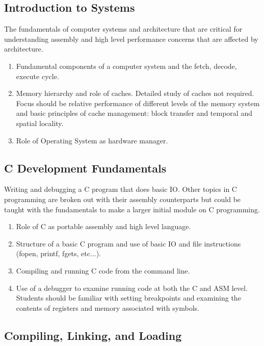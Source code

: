 \documentclass[12pt,letterpaper]{article}
\begin{document}
	\subsection{Introduction to Systems}

	The fundamentals of computer systems and architecture that are critical for understanding assembly and high level performance concerns that are affected by architecture.

	\begin{enumerate}
		\item Fundamental components of a computer system and the fetch, decode, execute cycle.
		\item Memory hierarchy and role of caches. Detailed study of caches not required. Focus should be relative performance of different levels of the memory system and basic principles of cache management: block transfer and temporal and spatial locality. 
		\item Role of Operating System as hardware manager.
	\end{enumerate}


	\subsection{C Development Fundamentals}

	Writing and debugging a C program that does basic IO. Other topics in C programming are broken out with their assembly counterparts but could be taught with the fundamentals to make a larger initial module on C programming.

	\begin{enumerate}
		\item Role of C as portable assembly and high level language.
		\item Structure of a basic C program and use of basic IO and file instructions (fopen, printf, fgets, etc...).
		\item Compiling and running C code from the command line.
		\item Use of a debugger to examine running code at both the C and ASM level. Students should be familiar with setting breakpoints and examining the contents of registers and memory associated with symbols.
	\end{enumerate}


	\subsection{Compiling, Linking, and Loading}
\end{document}
